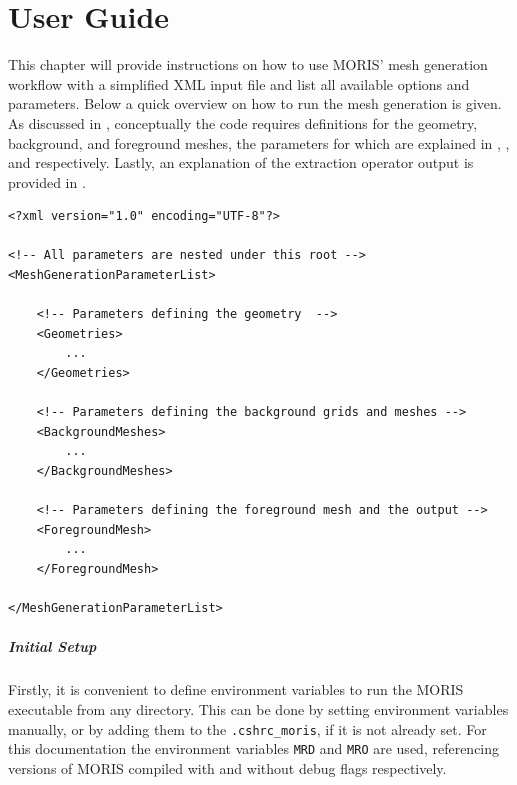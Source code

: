 \chapter{User Guide}
\label{sec:tutorial}

This chapter will provide instructions on how to use MORIS' mesh generation workflow with a simplified XML input file and list all available options and parameters.
Below a quick overview on how to run the mesh generation is given. As discussed in , conceptually the code requires definitions for the geometry, background, and foreground meshes, the parameters for which are explained in , , and  respectively. Lastly, an explanation of the extraction operator output is provided in .

\begin{minipage}{\linewidth}
\vspace{0.5cm}
\begin{lstlisting}[caption={Structure of the XML input file},captionpos=b, label={lst:input_structure}]
<?xml version="1.0" encoding="UTF-8"?>

<!-- All parameters are nested under this root -->
<MeshGenerationParameterList>

    <!-- Parameters defining the geometry  -->
    <Geometries>
        ...
    </Geometries>
    
    <!-- Parameters defining the background grids and meshes -->
    <BackgroundMeshes>
        ...
    </BackgroundMeshes>
    
    <!-- Parameters defining the foreground mesh and the output -->
    <ForegroundMesh>
        ...
    </ForegroundMesh>

</MeshGenerationParameterList>
\end{lstlisting}
\end{minipage}

\paragraph{Initial Setup} Firstly, it is convenient to define environment variables to run the MORIS executable from any directory. This can be done by setting environment variables manually, or by adding them to the \texttt{.cshrc\_moris}, if it is not already set. For this documentation the environment variables \texttt{MRD} and \texttt{MRO} are used, referencing versions of MORIS compiled with and without debug flags respectively.  

